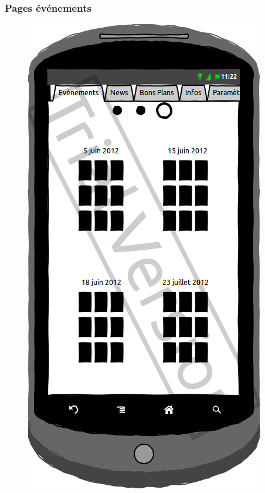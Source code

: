 \documentclass[a4paper, 11px]{article}
\begin{document}
\subsubsection{Pages événements}
\vfill
\begin{figure}[htbp]
	\begin{minipage}[c]{.50\linewidth}
		\begin{center}
			\includegraphics[scale=0.3]{../../Sketch/Android/quatreEvent.png}
		\end{center}
	\end{minipage}
	\hfill
	\begin{minipage}[c]{.50\linewidth}
		\begin{center}

\end{center}
\end{minipage}
\end{figure}
\end{document}

